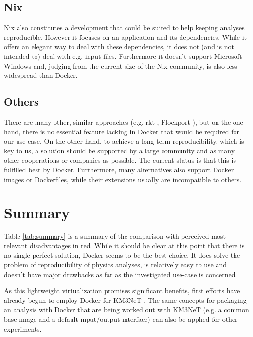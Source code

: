 \documentclass[a4paper, twoside, 11pt]{article}
\begin{document}
\subsection{Nix}
Nix \cite{nix:about} also constitutes a development that could be suited to help keeping analyses reproducible. 
However it focuses on an application and its dependencies. 
While it offers an elegant way to deal with these dependencies, it does not (and is not intended to) deal with e.g. input files. 
Furthermore it doesn't support Microsoft Windows and, 
judging from the current size of the Nix community, is also less widespread than Docker. 


\subsection{Others}
There are many other, similar approaches 
(e.g. rkt \cite{rkt:about}, Flockport \cite{flockport:about}), 
but on the one hand, there is no essential feature lacking in Docker that would be required 
for our use-case. 
On the other hand, to achieve a long-term reproducibility, which is key to us, 
a solution should be supported by a large community and as many other cooperations or companies as possible. 
The current status is that this is fulfilled best by Docker. 
Furthermore, many alternatives also support Docker images or Dockerfiles, while their extensions usually are incompatible to others. 


\section{Summary}

Table \ref{tab:summary} is a summary of the comparison with perceived most relevant disadvantages in red.  
While it should be clear at this point that there is no single perfect solution, 
Docker seems to be the best choice. It does solve the problem of reproducibility of physics analyses, 
is relatively easy to use \cite{km3net:howdocker} 
and doesn't have major drawbacks as far as the investigated use-case is concerned. 

As this lightweight virtualization promises significant benefits, 
first efforts have already begun to employ Docker for KM3NeT \cite{github:dockerprojects}. 
The same concepts for packaging an analysis with Docker that are being worked out with KM3NeT 
(e.g. a common base image and a default input/output interface) can also be applied for other experiments.
\end{document}
